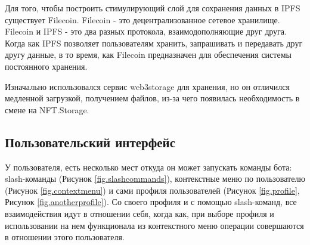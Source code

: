 \begin{remark}
    Для того, чтобы построить стимулирующий слой для сохранения данных в IPFS существует Filecoin. Filecoin - это децентрализованное сетевое хранилище. Filecoin и IPFS - это два разных протокола, взаимодополняющие друг друга. Когда как IPFS позволяет пользователям хранить, запрашивать и передавать друг другу данные, в то время, как Filecoin предназначен для обеспечения системы постоянного хранения.
\end{remark}

\begin{remark}
    Изначально использовался сервис web3storage\cite{web3storage} для хранения, но он отличился медленной загрузкой, получением файлов, из-за чего появилась необходимость в смене на NFT.Storage.
\end{remark}

\subsection{Пользовательский интерфейс}

У пользователя, есть несколько мест откуда он может запускать команды бота: slash-команды (Рисунок {\color{blue} \ref{fig.slashcommands}}), контекстные меню по пользователю (Рисунок {\color{blue} \ref{fig.contextmenu}}) и сами профиля пользователей (Рисунок {\color{blue} \ref{fig.profile}}, Рисунок {\color{blue} \ref{fig.anotherprofile}}). Со своего профиля и с помощью slash-команд, все взаимодействия идут в отношении себя, когда как, при выборе профиля и использовании на нем функционала из контекстного меню операции совершаются в отношении этого пользователя.


